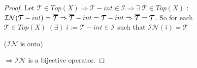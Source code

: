 \documentclass[a4paper,12pt]{report}
\begin{document}
\begin{proof}
Let $\mathcal{T} \in Top(X) \Rightarrow \mathcal{T}-int \in \mathcal{I} \Rightarrow \exists\; \overline{\mathcal{T}} \in Top(X)$ : $\mathcal{IN}(\mathcal{T}-int) = \overline{\mathcal{T}} \\ \Rightarrow \overline{\mathcal{T}}-int = \mathcal{T}-int \Rightarrow \overline{\mathcal{T}} = \mathcal{T}$. So for each $\mathcal{T} \in Top(X) \;(\exists)\; i:= \mathcal{T}-int \in \mathcal{I}$ such that $\mathcal{IN}(i) = \mathcal{T}$
\begin{center}
($\mathcal{IN}$ is onto)
\end{center}

$\Rightarrow \mathcal{IN}$ is a bijective operator.
\end{proof}
\end{document}
